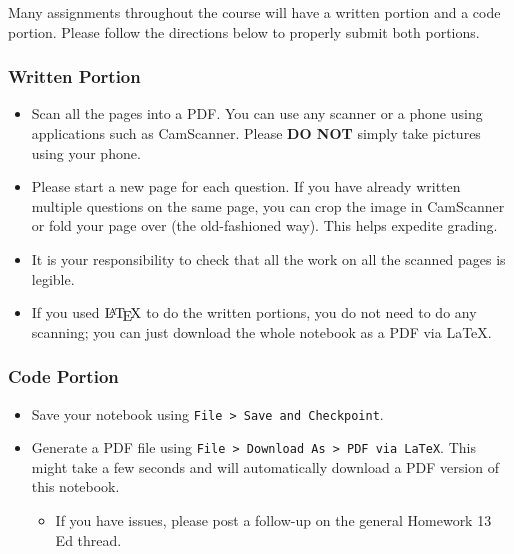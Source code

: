\documentclass[11pt]{article}
\providecommand{\tightlist}{%
      \setlength{\itemsep}{0pt}\setlength{\parskip}{0pt}}
\let\Oldlatex\LaTeX
\renewcommand{\LaTeX}{\textrm{\Oldlatex}}
\begin{document}
Many assignments throughout the course will have a written portion and a
code portion. Please follow the directions below to properly submit both
portions.

\hypertarget{written-portion}{%
\subsubsection{Written Portion}\label{written-portion}}

\begin{itemize}
\tightlist
\item
  Scan all the pages into a PDF. You can use any scanner or a phone
  using applications such as CamScanner. Please \textbf{DO NOT} simply
  take pictures using your phone.
\item
  Please start a new page for each question. If you have already written
  multiple questions on the same page, you can crop the image in
  CamScanner or fold your page over (the old-fashioned way). This helps
  expedite grading.
\item
  It is your responsibility to check that all the work on all the
  scanned pages is legible.
\item
  If you used \(\LaTeX\) to do the written portions, you do not need to
  do any scanning; you can just download the whole notebook as a PDF via
  LaTeX.
\end{itemize}

\hypertarget{code-portion}{%
\subsubsection{Code Portion}\label{code-portion}}

\begin{itemize}
\tightlist
\item
  Save your notebook using
  \texttt{File\ \textgreater{}\ Save\ and\ Checkpoint}.
\item
  Generate a PDF file using
  \texttt{File\ \textgreater{}\ Download\ As\ \textgreater{}\ PDF\ via\ LaTeX}.
  This might take a few seconds and will automatically download a PDF
  version of this notebook.

  \begin{itemize}
  \tightlist
  \item
    If you have issues, please post a follow-up on the general Homework
    13 Ed thread.
  \end{itemize}
\end{itemize}
\end{document}
